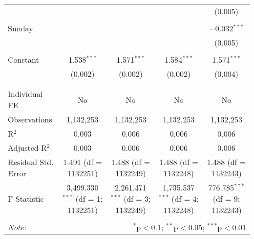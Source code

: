 \documentclass[
]{article}
\begin{document}
\begin{table}[!htbp]
{\begin{tabular}{@{\extracolsep{5pt}}lcccc}
  &  &  &  & (0.005) \\ 
  & & & & \\ 
 Sunday &  &  &  & $-$0.032$^{***}$ \\ 
  &  &  &  & (0.005) \\ 
  & & & & \\ 
 Constant & 1.538$^{***}$ & 1.571$^{***}$ & 1.584$^{***}$ & 1.571$^{***}$ \\ 
  & (0.002) & (0.002) & (0.002) & (0.004) \\ 
  & & & & \\ 
\hline \\[-1.8ex] 
Individual FE & No & No & No & No \\ 
Observations & 1,132,253 & 1,132,253 & 1,132,253 & 1,132,253 \\ 
R$^{2}$ & 0.003 & 0.006 & 0.006 & 0.006 \\ 
Adjusted R$^{2}$ & 0.003 & 0.006 & 0.006 & 0.006 \\ 
Residual Std. Error & 1.491 (df = 1132251) & 1.488 (df = 1132249) & 1.488 (df = 1132248) & 1.488 (df = 1132243) \\ 
F Statistic & 3,499.330$^{***}$ (df = 1; 1132251) & 2,261.471$^{***}$ (df = 3; 1132249) & 1,735.537$^{***}$ (df = 4; 1132248) & 776.785$^{***}$ (df = 9; 1132243) \\ 
\hline 
\hline \\[-1.8ex] 
\textit{Note:}  & \multicolumn{4}{r}{$^{*}$p$<$0.1; $^{**}$p$<$0.05; $^{***}$p$<$0.01} \\ 
\end{tabular}
} 
\end{table} 
\newpage
\end{document}
